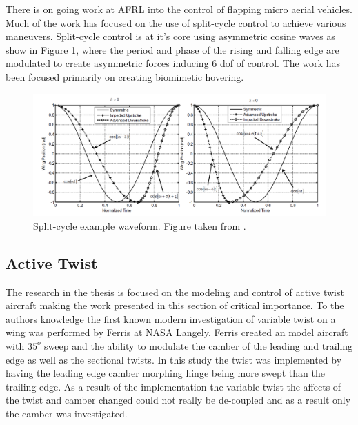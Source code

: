 \documentclass[11pt]{ucthesis}
\begin{document}
There is on going work at AFRL into the control of flapping micro aerial vehicles. Much of the work has focused on the use of split-cycle control to achieve various maneuvers. \cite{weintraub2014implementation} Split-cycle control is at it's core using asymmetric cosine waves as show in Figure \ref{fig:splitCycle}, where the period and phase of the rising and falling edge are modulated to create asymmetric forces inducing 6 dof of control. The  work has been focused primarily on creating biomimetic hovering. \cite{doman2010wingbeat,oppenheimer2011dynamics}

\begin{figure}[h]
\centering
\includegraphics[width=1\linewidth]{./Figures/splitCycle.png}
\caption{Split-cycle example waveform. Figure taken from  \cite{weintraub2014implementation}.}
\label{fig:splitCycle}
\end{figure}

\subsection{Active Twist}

The research in the thesis is focused on the modeling and control of active twist aircraft making the work presented in this section of critical importance. To the authors knowledge the first known modern investigation of variable twist on a wing was performed by Ferris at NASA Langely. \cite{ferris1977wind} Ferris created an model aircraft with $35^{o}$ sweep and the ability to modulate the camber of the leading and trailing edge as well as the sectional twists. In this study the twist was implemented by having the leading edge camber morphing hinge being more swept than the trailing edge. As a result of the implementation the variable twist the affects of the twist and camber changed could not really be de-coupled and as a result only the camber was investigated.
\end{document}
